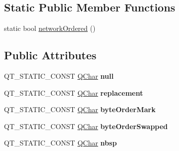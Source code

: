 \subsection*{Static Public Member Functions}
\begin{DoxyCompactItemize}
\item 
static bool \mbox{\hyperlink{class_q_char_a6412de50d41df09c99e4c93ed4b802dc}{network\+Ordered}} ()
\end{DoxyCompactItemize}
\subsection*{Public Attributes}
\begin{DoxyCompactItemize}
\item 
\mbox{\label{class_q_char_afdc80b6130ca162603a5bc20ca74942b}} 
Q\+T\+\_\+\+S\+T\+A\+T\+I\+C\+\_\+\+C\+O\+N\+ST \mbox{\hyperlink{class_q_char}{Q\+Char}} {\bfseries null}
\item 
\mbox{\label{class_q_char_abdeb014a60f5abbaa2c136f9d746e3a2}} 
Q\+T\+\_\+\+S\+T\+A\+T\+I\+C\+\_\+\+C\+O\+N\+ST \mbox{\hyperlink{class_q_char}{Q\+Char}} {\bfseries replacement}
\item 
\mbox{\label{class_q_char_a830ccc008bee0a07b0eb57232d347d08}} 
Q\+T\+\_\+\+S\+T\+A\+T\+I\+C\+\_\+\+C\+O\+N\+ST \mbox{\hyperlink{class_q_char}{Q\+Char}} {\bfseries byte\+Order\+Mark}
\item 
\mbox{\label{class_q_char_ada7e951f45ce64ab6a51b9995d82aaf8}} 
Q\+T\+\_\+\+S\+T\+A\+T\+I\+C\+\_\+\+C\+O\+N\+ST \mbox{\hyperlink{class_q_char}{Q\+Char}} {\bfseries byte\+Order\+Swapped}
\item 
\mbox{\label{class_q_char_af63d0090d00cf90fe934fb2554a595cb}} 
Q\+T\+\_\+\+S\+T\+A\+T\+I\+C\+\_\+\+C\+O\+N\+ST \mbox{\hyperlink{class_q_char}{Q\+Char}} {\bfseries nbsp}
\end{DoxyCompactItemize}
